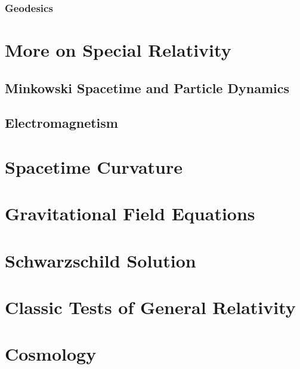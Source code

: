 \documentclass[a4paper]{article}
\theoremstyle{new}
\begin{document}
\newpage
\subsubsection{Geodesics}
\newpage
\section{More on Special Relativity}
\subsection{Minkowski Spacetime and Particle Dynamics}
\newpage
\subsection{Electromagnetism}
\newpage
\section{Spacetime Curvature}
\newpage
\section{Gravitational Field Equations}
\newpage
\section{Schwarzschild Solution}
\newpage
\section{Classic Tests of General Relativity}
\newpage
\section{Cosmology}
\end{document}
